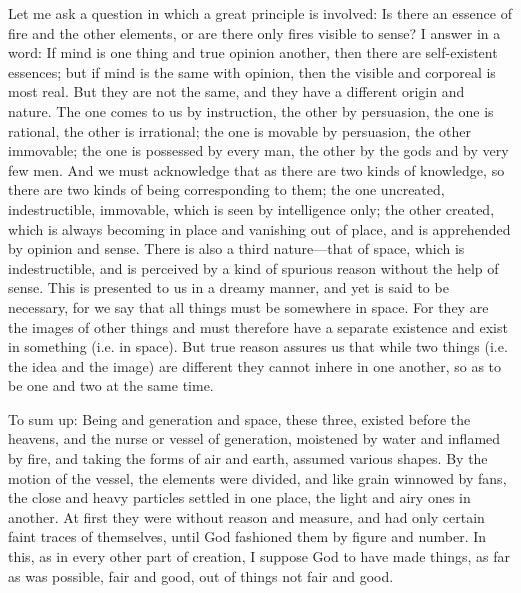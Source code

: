 \documentclass[11pt,letter]{article}
\begin{document}
\par  Let me ask a question in which a great principle is involved: Is there an essence of fire and the other elements, or are there only fires visible to sense? I answer in a word: If mind is one thing and true opinion another, then there are self-existent essences; but if mind is the same with opinion, then the visible and corporeal is most real. But they are not the same, and they have a different origin and nature. The one comes to us by instruction, the other by persuasion, the one is rational, the other is irrational; the one is movable by persuasion, the other immovable; the one is possessed by every man, the other by the gods and by very few men. And we must acknowledge that as there are two kinds of knowledge, so there are two kinds of being corresponding to them; the one uncreated, indestructible, immovable, which is seen by intelligence only; the other created, which is always becoming in place and vanishing out of place, and is apprehended by opinion and sense. There is also a third nature—that of space, which is indestructible, and is perceived by a kind of spurious reason without the help of sense. This is presented to us in a dreamy manner, and yet is said to be necessary, for we say that all things must be somewhere in space. For they are the images of other things and must therefore have a separate existence and exist in something (i.e. in space). But true reason assures us that while two things (i.e. the idea and the image) are different they cannot inhere in one another, so as to be one and two at the same time.

\par  To sum up: Being and generation and space, these three, existed before the heavens, and the nurse or vessel of generation, moistened by water and inflamed by fire, and taking the forms of air and earth, assumed various shapes. By the motion of the vessel, the elements were divided, and like grain winnowed by fans, the close and heavy particles settled in one place, the light and airy ones in another. At first they were without reason and measure, and had only certain faint traces of themselves, until God fashioned them by figure and number. In this, as in every other part of creation, I suppose God to have made things, as far as was possible, fair and good, out of things not fair and good.
\end{document}
